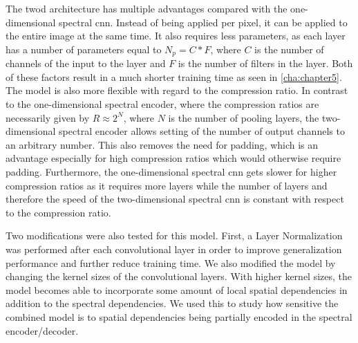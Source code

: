 The \ac{twod} architecture has multiple advantages compared with the one-dimensional spectral \ac{cnn}. Instead of being applied per pixel, it can be applied to the entire image at the same time. It also requires less parameters, as each layer has a number of parameters equal to $N_p = C * F$, where $C$ is the number of channels of the input to the layer and $F$ is the number of filters in the layer. Both of these factors result in a much shorter training time as seen in \autoref{cha:chapter5}. The model is also more flexible with regard to the compression ratio. In contrast to the one-dimensional spectral encoder, where the compression ratios are necessarily given by $R \approx 2^N$, where $N$ is the number of pooling layers, the two-dimensional spectral encoder allows setting of the number of output channels to an arbitrary number. This also removes the need for padding, which is an advantage especially for high compression ratios which would otherwise require padding. Furthermore, the one-dimensional spectral \ac{cnn} gets slower for higher compression ratios as it requires more layers while the number of layers and therefore the speed of the two-dimensional spectral \ac{cnn} is constant with respect to the compression ratio.

Two modifications were also tested for this model. First, a Layer Normalization was performed after each convolutional layer in order to improve generalization performance and further reduce training time.  We also modified the model by changing the kernel sizes of the convolutional layers. With higher kernel sizes, the model becomes able to incorporate some amount of local spatial dependencies in addition to the spectral dependencies. We used this to study how sensitive the combined model is to spatial dependencies being partially encoded in the spectral encoder/decoder.
